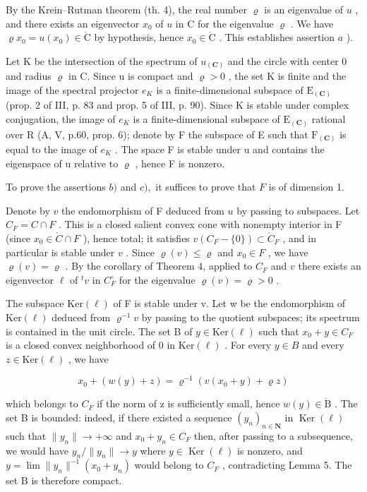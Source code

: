 By the Krein--Rutman theorem (th. 4), the real number \(\varrho\) is an eigenvalue of \(u\) , and there exists an eigenvector \(x_0\) of \(u\) in C for the eigenvalue \(\varrho\) . We have \(\varrho x_0 = u(x_0) \in \mathring{\mathrm{C}}\) by hypothesis, hence \(x_0 \in \mathring{\mathrm{C}}\) . This establishes assertion \(a\) ).

Let K be the intersection of the spectrum of \(u_{(\mathbf{C})}\) and the circle with center 0 and radius \(\varrho\) in C. Since u is compact and \(\varrho > 0\) , the set K is finite and the image of the spectral projector \(e_{K}\) is a finite-dimensional subspace of \(\mathrm{E}_{(\mathbf{C})}\) (prop. 2 of III, p. 83 and prop. 5 of III, p. 90). Since K is stable under complex conjugation, the image of \(e_{K}\) is a finite-dimensional subspace of \(\mathrm{E}_{(\mathbf{C})}\) rational over R (A, V, p.60, prop. 6); denote by F the subspace of E such that \(\mathrm{F}_{(\mathbf{C})}\) is equal to the image of \(e_{K}\) . The space F is stable under u and contains the eigenspace of u relative to \(\varrho\) , hence F is nonzero.

To prove the assertions \(b)\) and \(c),\) it suffices to prove that \(F\) is of dimension 1.

Denote by \(v\) the endomorphism of F deduced from \(u\) by passing to subspaces. Let \(C_F = C \cap F\) . This is a closed salient convex cone with nonempty interior in F (since \(x_0 \in \mathring{C} \cap F\) ), hence total; it satisfies \(v(C_F - \{0\}) \subset \mathring{C}_F\) , and in particular is stable under \(v\) . Since \(\varrho(v) \leqslant \varrho\) and \(x_0 \in F\) , we have \(\varrho(v) = \varrho\) . By the corollary of Theorem 4, applied to \(C_F\) and \(v\) there exists an eigenvector \(\ell\) of \(^t v\) in \(C_F^\circ\) for the eigenvalue \(\varrho(v) = \varrho > 0\) .

The subspace \(\mathrm{Ker}(\ell)\) of F is stable under v. Let w be the endomorphism of \(\mathrm{Ker}(\ell)\) deduced from \(\varrho^{-1}v\) by passing to the quotient subspaces; its spectrum is contained in the unit circle. The set B of \(y \in \mathrm{Ker}(\ell)\) such that \(x_{0} + y \in C_{F}\) is a closed convex neighborhood of 0 in \(\mathrm{Ker}(\ell)\) . For every \(y \in B\) and every \(z \in \mathrm{Ker}(\ell)\) , we have

\[
x _ {0} + (w (y) + z) = \varrho^ {- 1} (v (x _ {0} + y) + \varrho z)
\]

which belongs to \(C_{F}\) if the norm of z is sufficiently small, hence \(w(y) \in \mathring{\mathrm{B}}\) . The set B is bounded: indeed, if there existed a sequence \((y_{n})_{n \in \mathbf{N}}\) in \(\operatorname{Ker}(\ell)\) such that \(\|y_{n}\| \to +\infty\) and \(x_{0} + y_{n} \in C_{F}\) then, after passing to a subsequence, we would have \(y_{n}/\|y_{n}\| \to y\) where \(y \in \operatorname{Ker}(\ell)\) is nonzero, and \(y = \lim \|y_{n}\|^{-1}(x_{0} + y_{n})\) would belong to \(C_{F}\) , contradicting Lemma 5. The set B is therefore compact.

